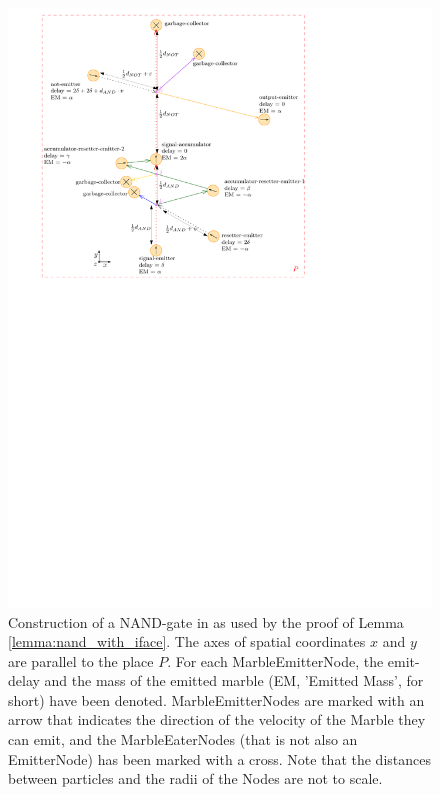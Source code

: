 \begin{figure}[h]
    \centering
    \includegraphics{figures/nand_with_interfaces_v6.pdf}
    \caption{Construction of a NAND-gate in \nenwin as used by the proof of Lemma \ref{lemma:nand_with_iface}. The axes of spatial coordinates $x$ and $y$ are parallel to the place $P$. For each MarbleEmitterNode, the emit-delay and the mass of the emitted marble (EM, 'Emitted Mass', for short) have been denoted. MarbleEmitterNodes are marked with an arrow that indicates the direction of the velocity of the Marble they can emit, and the MarbleEaterNodes (that is not also an EmitterNode) has been marked with a cross. Note that the distances between particles and the radii of the Nodes are not to scale.}
    \label{fig:nand_with_iface}
\end{figure}
\clearpage